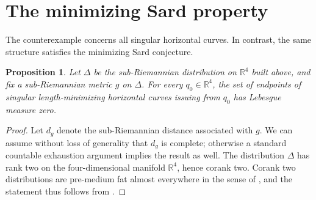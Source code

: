 \documentclass[11pt]{amsart}
\newtheorem{proposition}[theorem]{Proposition}
\numberwithin{equation}{section}
\theoremstyle{remark}
\newcommand{\R}{\mathbb R}
\newcommand{\dd}{\,\mathrm d}
\begin{document}
\section{The minimizing Sard property}
\label{sec:minimizing}

The counterexample concerns all singular horizontal curves.  In contrast,
the same structure satisfies the minimizing Sard conjecture.

\begin{proposition}
\label{prop:minimizing-sard}
Let $\Delta$ be the sub-Riemannian distribution on $\R^4$ built above, and fix a sub-Riemannian metric $g$ on $\Delta$. For every $q_0\in\R^4$, the set of endpoints of singular length-minimizing horizontal curves issuing from $q_0$ has Lebesgue measure zero.
\end{proposition}

\begin{proof}
Let $d_g$ denote the sub-Riemannian distance associated with $g$. We can assume without loss of generality that $d_g$ is complete; otherwise a standard countable exhaustion argument implies the result as well. The distribution $\Delta$ has rank two on the four-dimensional manifold
$\R^4$, hence corank two. Corank two distributions are pre-medium fat almost everywhere in the sense of \cite{RiffordMinSard}, and the statement thus follows from \cite[Corollary~1.3]{RiffordMinSard}.
\end{proof}
\end{document}
